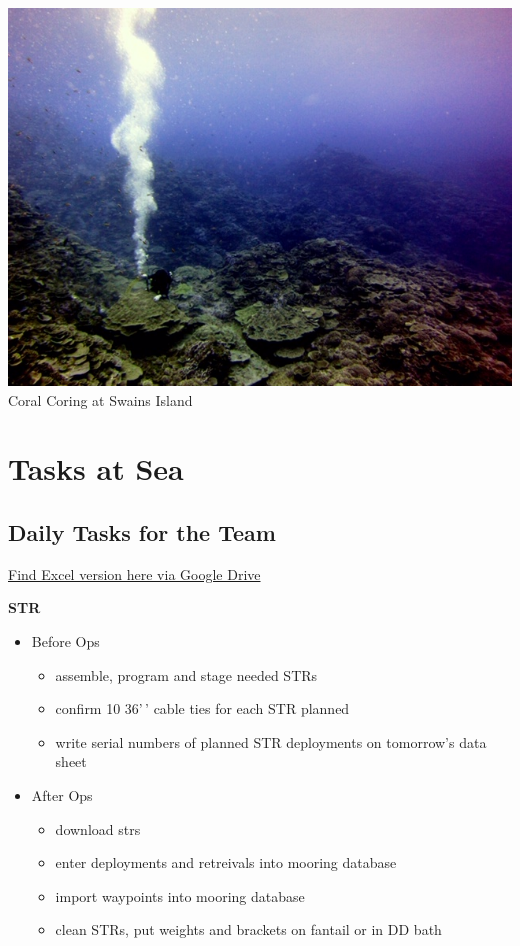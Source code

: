 \documentclass[
]{book}
\providecommand{\tightlist}{%
  \setlength{\itemsep}{0pt}\setlength{\parskip}{0pt}}
\begin{document}
\includegraphics{images/Merritt_Coring_by_Pomeroy.jpg}
Coral Coring at Swains Island

\hypertarget{tasks}{%
\chapter{Tasks at Sea}\label{tasks}}

\hypertarget{daily-tasks-for-the-team}{%
\section{Daily Tasks for the Team}\label{daily-tasks-for-the-team}}

\href{https://drive.google.com/open?id=1I4Hojo0qjKtUwhRqgc9aLM6_fGtjqZMM}{Find Excel version here via Google Drive}

\textbf{STR}

\begin{itemize}
\tightlist
\item
  Before Ops

  \begin{itemize}
  \tightlist
  \item
    assemble, program and stage needed STRs
  \item
    confirm 10 36'\,' cable ties for each STR planned
  \item
    write serial numbers of planned STR deployments on tomorrow's data sheet
  \end{itemize}
\item
  After Ops

  \begin{itemize}
  \tightlist
  \item
    download strs
  \item
    enter deployments and retreivals into mooring database
  \item
    import waypoints into mooring database
  \item
    clean STRs, put weights and brackets on fantail or in DD bath
  \end{itemize}
\end{itemize}
\end{document}
